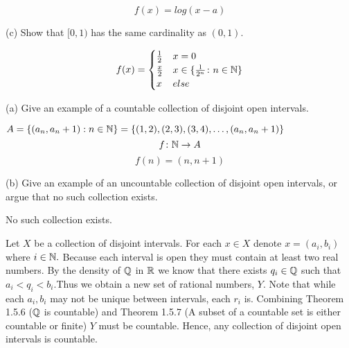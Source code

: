 \documentclass{report}
\begin{document}
\sol
$$
f(x)=log(x-a)
$$

\par \bigskip
(c) Show that $[0,1)$ has the same cardinality as $(0,1)$. 



\sol


$$ f(x) = 
  \begin{cases} 
    \frac{1}{2} & x= 0 \\
    \frac{x}{2} &  x \in \{ \frac{1}{2^n} \colon n \in \NN \} \\
    x & else
   \end{cases}
$$
\sol


 (a) Give an example of a countable collection of disjoint open intervals.
\par \bigskip

$A=\{(a_n,a_n+1): n \in \NN\} = \{(1,2),(2,3),(3,4),\dots,(a_n,a_n+1)\}$
\smallskip 
$$
f \colon \NN \rightarrow A 
$$ $$ f(n)= (n, n+1)$$
\par \bigskip

 (b) Give an example of an uncountable collection of disjoint open intervals, or argue that no such collection exists.


No such collection exists.

\begin{myproof}
    
Let $X$ be a collection of disjoint intervals. For each $x \in X$ denote $x = (a_i, b_i)$ where $i \in \NN.$ Because each interval is open they must contain at least two real numbers. By the density of $\QQ$ in $\RR$ we know that there exists $q_i \in \QQ$ such that $a_i < q_i < b_i.$Thus we obtain a new set of rational numbers, $Y$. Note that while each $a_i, b_i$ may not be unique between intervals, each $r_i$ is. Combining Theorem 1.5.6 ($\QQ$ is countable) and Theorem 1.5.7 (A subset of a countable set is either countable or finite) $Y$ must be countable. Hence, any collection of disjoint open intervals is countable.

\end{myproof}

\end{document}
